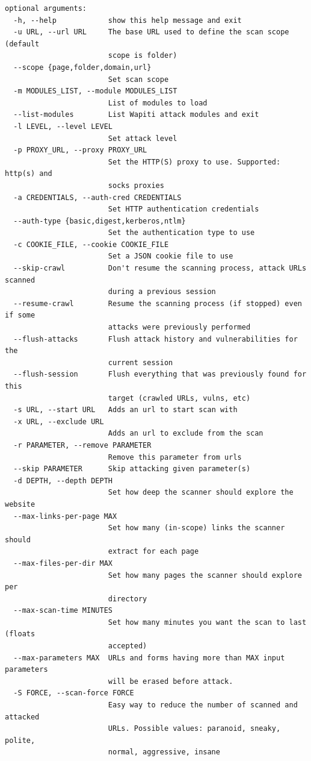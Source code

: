 \documentclass{article}
\begin{document}
\begin{lstlisting}
optional arguments:
  -h, --help            show this help message and exit
  -u URL, --url URL     The base URL used to define the scan scope (default
                        scope is folder)
  --scope {page,folder,domain,url}
                        Set scan scope
  -m MODULES_LIST, --module MODULES_LIST
                        List of modules to load
  --list-modules        List Wapiti attack modules and exit
  -l LEVEL, --level LEVEL
                        Set attack level
  -p PROXY_URL, --proxy PROXY_URL
                        Set the HTTP(S) proxy to use. Supported: http(s) and
                        socks proxies
  -a CREDENTIALS, --auth-cred CREDENTIALS
                        Set HTTP authentication credentials
  --auth-type {basic,digest,kerberos,ntlm}
                        Set the authentication type to use
  -c COOKIE_FILE, --cookie COOKIE_FILE
                        Set a JSON cookie file to use
  --skip-crawl          Don't resume the scanning process, attack URLs scanned
                        during a previous session
  --resume-crawl        Resume the scanning process (if stopped) even if some
                        attacks were previously performed
  --flush-attacks       Flush attack history and vulnerabilities for the
                        current session
  --flush-session       Flush everything that was previously found for this
                        target (crawled URLs, vulns, etc)
  -s URL, --start URL   Adds an url to start scan with
  -x URL, --exclude URL
                        Adds an url to exclude from the scan
  -r PARAMETER, --remove PARAMETER
                        Remove this parameter from urls
  --skip PARAMETER      Skip attacking given parameter(s)
  -d DEPTH, --depth DEPTH
                        Set how deep the scanner should explore the website
  --max-links-per-page MAX
                        Set how many (in-scope) links the scanner should
                        extract for each page
  --max-files-per-dir MAX
                        Set how many pages the scanner should explore per
                        directory
  --max-scan-time MINUTES
                        Set how many minutes you want the scan to last (floats
                        accepted)
  --max-parameters MAX  URLs and forms having more than MAX input parameters
                        will be erased before attack.
  -S FORCE, --scan-force FORCE
                        Easy way to reduce the number of scanned and attacked
                        URLs. Possible values: paranoid, sneaky, polite,
                        normal, aggressive, insane

\end{lstlisting}
\end{document}
